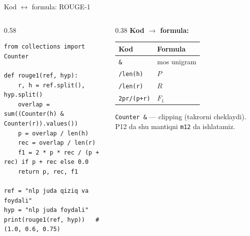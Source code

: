 \documentclass[aspectratio=169,11pt]{beamer}
\begin{document}
\begin{frame}[fragile]{Kod $\leftrightarrow$ formula: ROUGE-1}
  \begin{columns}[T]
    \begin{column}{0.58\textwidth}
\begin{lstlisting}
from collections import Counter

def rouge1(ref, hyp):
    r, h = ref.split(), hyp.split()
    overlap = sum((Counter(h) & Counter(r)).values())
    p = overlap / len(h)
    rec = overlap / len(r)
    f1 = 2 * p * rec / (p + rec) if p + rec else 0.0
    return p, rec, f1

ref = "nlp juda qiziq va foydali"
hyp = "nlp juda foydali"
print(rouge1(ref, hyp))   # (1.0, 0.6, 0.75)
\end{lstlisting}
    \end{column}
    \begin{column}{0.38\textwidth}
      \textbf{Kod $\to$ formula:}\\[3pt]
      \footnotesize
      \begin{tabular}{p{1.7cm}p{1.9cm}}
        \toprule
        Kod & Formula \\
        \midrule
        \texttt{\&} & mos unigram \\
        \texttt{/len(h)} & $P$ \\
        \texttt{/len(r)} & $R$ \\
        \texttt{2pr/(p+r)} & $F_1$ \\
        \bottomrule
      \end{tabular}
      \vspace{4pt}
      \begin{tcolorbox}[okbox,top=2pt,bottom=2pt]
        \footnotesize
        \texttt{Counter \&} --- clipping (takrorni cheklaydi). P12 da shu
        mantiqni \texttt{m12} da ishlatamiz.
      \end{tcolorbox}
    \end{column}
  \end{columns}
\end{frame}
\end{document}
